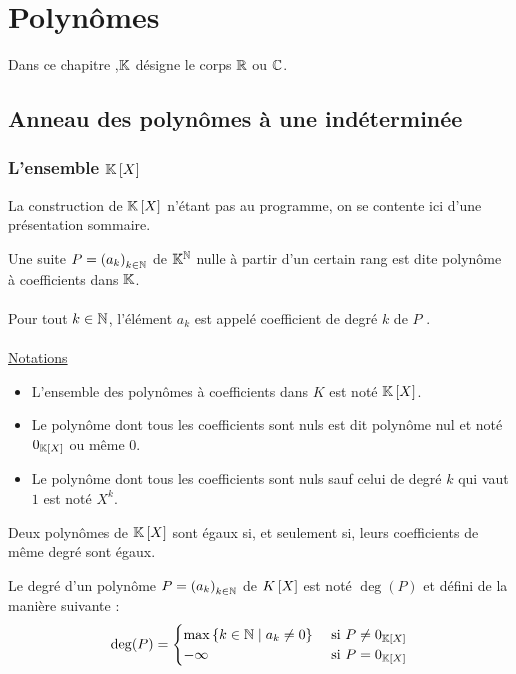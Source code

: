 \chapter{Polynômes}

\minitoc
Dans ce chapitre ,\(\mathbb{K}\) désigne le corps \(\mathbb{R}\) ou \(\mathbb{C}\).


\section{Anneau des polynômes à une indéterminée}

\subsection{L'ensemble \(\mathbb{K}\left[X\right]\)}

La construction de \(\mathbb{K} \left[X\right]\) n’étant pas au programme, on se contente ici d’une présentation sommaire.


\begin{defprop}
    Une suite \(P = \left(a_k\right)_{k\in \mathbb{N}}\) de \(\mathbb{K}^{\mathbb{N}}\) nulle à partir d’un certain rang est dite polynôme à coefficients dans \(\mathbb{K}\).\\~\\
    Pour tout \(k \in \mathbb{N}\), l’élément \(a_k\) est appelé coefficient de degré \(k\) de \(P\) .\\~\\
    \underline{Notations}
    \begin{itemize} 
    \item L’ensemble des polynômes à coefficients dans \(K\) est noté \(\mathbb{K}\left[X\right]\).
    \item Le polynôme dont tous les coefficients sont nuls est dit polynôme nul et noté \(0_{\mathbb{K}\left[X\right]}\) ou même \(0\).
    \item Le polynôme dont tous les coefficients sont nuls sauf celui de degré \(k\) qui vaut \(1\) est noté \(X^k\).
    \end{itemize} 
\end{defprop}
\begin{defprop}
    Deux polynômes de \(\mathbb{K}\left[X\right]\) sont égaux si, et seulement si, leurs coefficients de même degré sont égaux.
\end{defprop}

\begin{defprop}
    Le degré d’un polynôme \(P = \left(a_k\right)_{k\in \mathbb{N}}\) de \(K\left[X\right]\) est noté \(\deg(P)\) et défini de la manière suivante :
    \[\deg(P ) =\begin{cases}
    \max \left\lbrace k \in \mathbb{N} \;\middle|\; a_k\neq 0\right\rbrace &\text{ si } P\neq 0_{\mathbb{K}\left[X\right]}\\
    -\infty &\text{ si } P = 0_{\mathbb{K}\left[X\right]}
    \end{cases}\]
\end{defprop}

